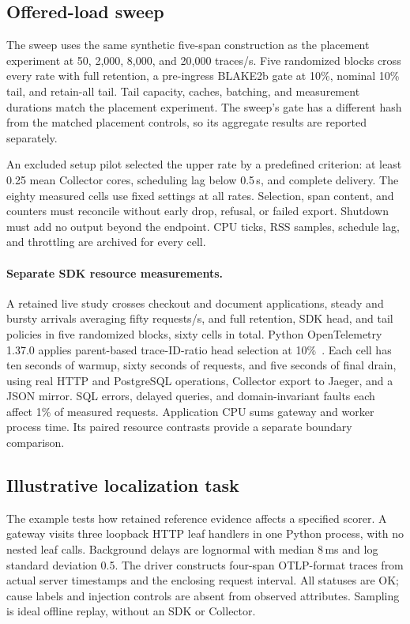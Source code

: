 \subsection{Offered-load sweep}\label{sec:load-method}
The sweep uses the same synthetic five-span construction as the placement experiment at 50, 2,000, 8,000, and 20,000 traces/s. Five randomized blocks cross every rate with full retention, a pre-ingress BLAKE2b gate at 10\%, nominal 10\% tail, and retain-all tail. Tail capacity, caches, batching, and measurement durations match the placement experiment. The sweep's gate has a different hash from the matched placement controls, so its aggregate results are reported separately.

An excluded setup pilot selected the upper rate by a predefined criterion: at least 0.25 mean Collector cores, scheduling lag below 0.5\,s, and complete delivery. The eighty measured cells use fixed settings at all rates. Selection, span content, and counters must reconcile without early drop, refusal, or failed export. Shutdown must add no output beyond the endpoint. CPU ticks, RSS samples, schedule lag, and throttling are archived for every cell.

\paragraph{Separate SDK resource measurements.}
A retained live study crosses checkout and document applications, steady and bursty arrivals averaging fifty requests/s, and full retention, SDK head, and tail policies in five randomized blocks, sixty cells in total. Python OpenTelemetry 1.37.0 applies parent-based trace-ID-ratio head selection at 10\%~\cite{otelPythonSampler137}. Each cell has ten seconds of warmup, sixty seconds of requests, and five seconds of final drain, using real HTTP and PostgreSQL operations, Collector export to Jaeger, and a JSON mirror. SQL errors, delayed queries, and domain-invariant faults each affect 1\% of measured requests. Application CPU sums gateway and worker process time. Its paired resource contrasts provide a separate boundary comparison.

\subsection{Illustrative localization task}\label{sec:diagnosis-method}
The example tests how retained reference evidence affects a specified scorer. A gateway visits three loopback HTTP leaf handlers in one Python process, with no nested leaf calls. Background delays are lognormal with median 8\,ms and log standard deviation 0.5. The driver constructs four-span OTLP-format traces from actual server timestamps and the enclosing request interval. All statuses are OK; cause labels and injection controls are absent from observed attributes. Sampling is ideal offline replay, without an SDK or Collector.

